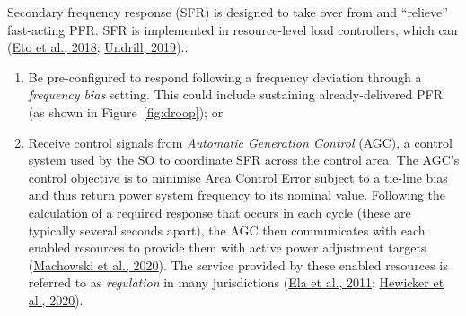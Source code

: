 \documentclass[12pt,a4paper,]{report}
\providecommand{\tightlist}{%
  \setlength{\itemsep}{0pt}\setlength{\parskip}{0pt}}
\begin{document}
Secondary frequency response (SFR) is designed to take over from and
``relieve'' fast-acting PFR. SFR is implemented in resource-level load
controllers, which can
(\protect\hyperlink{ref-etoFrequencyControlRequirements2018}{Eto et al.,
2018}; \protect\hyperlink{ref-undrillNotesFrequencyControl2019}{Undrill,
2019}).:

\begin{enumerate}
\def\labelenumi{\arabic{enumi}.}
\tightlist
\item
  Be pre-configured to respond following a frequency deviation through a
  \emph{frequency bias} setting. This could include sustaining
  already-delivered PFR (as shown in Figure~\ref{fig:droop}); or
\item
  Receive control signals from \emph{Automatic Generation Control}
  (AGC), a control system used by the SO to coordinate SFR across the
  control area. The AGC's control objective is to minimise Area Control
  Error subject to a tie-line bias and thus return power system
  frequency to its nominal value. Following the calculation of a
  required response that occurs in each cycle (these are typically
  several seconds apart), the AGC then communicates with each enabled
  resources to provide them with active power adjustment targets
  (\protect\hyperlink{ref-machowskiPowerSystemDynamics2020}{Machowski et
  al., 2020}). The service provided by these enabled resources is
  referred to as \emph{regulation} in many jurisdictions
  (\protect\hyperlink{ref-elaOperatingReservesVariable2011}{Ela et al.,
  2011};
  \protect\hyperlink{ref-hewickerDimensioningControlReserves2020}{Hewicker
  et al., 2020}).
\end{enumerate}
\end{document}
